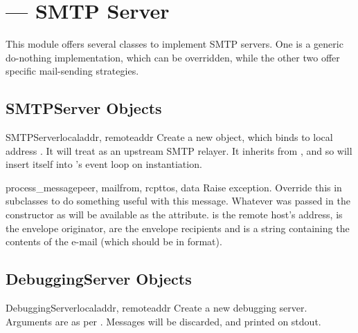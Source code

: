\section{ ---
         SMTP Server}




This module offers several classes to implement SMTP servers.  One is
a generic do-nothing implementation, which can be overridden, while
the other two offer specific mail-sending strategies.


\subsection{SMTPServer Objects}

\begin{classdesc}{SMTPServer}{localaddr, remoteaddr}
Create a new  object, which binds to local address
.  It will treat  as an upstream SMTP
relayer.  It inherits from , and so will
insert itself into 's event loop on instantiation.
\end{classdesc}

\begin{methoddesc}[SMTPServer]{process_message}{peer, mailfrom, rcpttos, data}
Raise  exception. Override this in
subclasses to do something useful with this message. Whatever was
passed in the constructor as  will be available as the
 attribute.  is the remote host's address,
 is the envelope originator,  are the
envelope recipients and  is a string containing the contents
of the e-mail (which should be in  format).
\end{methoddesc}


\subsection{DebuggingServer Objects}

\begin{classdesc}{DebuggingServer}{localaddr, remoteaddr}
Create a new debugging server.  Arguments are as per
.  Messages will be discarded, and printed on
stdout.
\end{classdesc}


